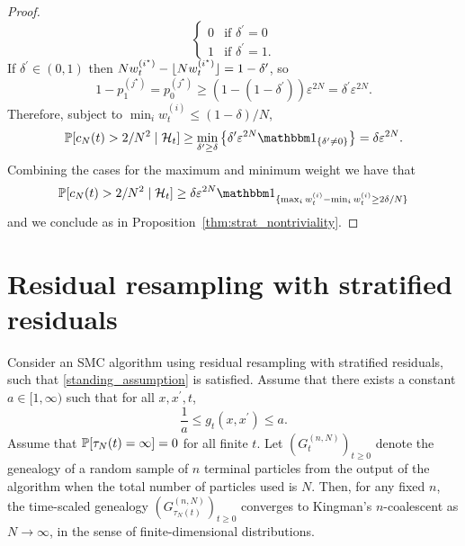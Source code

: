 \begin{proof}
\begin{equation*}
\begin{cases}
    0 & \text{if } \delta^\prime = 0 \\
    1 & \text{if } \delta^\prime = 1 .
\end{cases}
\end{equation*}
If $\delta^\prime \in (0,1)$ then
$N w_t^{(i^\star)} - \flnw[i^\star] = 1- \delta^\prime$, so
\begin{equation*}
1 - p_1^{(j^\star)}
= p_0^{(j^\star)}
\geq ( 1- (1-\delta^\prime) ) \varepsilon^{2N}
= \delta^\prime \varepsilon^{2N} .
\end{equation*}
Therefore, subject to $\min_i w_t^{(i)} \leq (1-\delta)/N$,
\begin{equation*}
\Prob[ c_N(t) > 2/N^2 \mid \mathcal{H}_t ]
\geq \min_{\delta^\prime \geq \delta} 
        \left\{ \delta^\prime \varepsilon^{2N} \I{\delta^\prime \neq 0} \right\}
= \delta \varepsilon^{2N} .
\end{equation*}
Combining the cases for the maximum and minimum weight we have that
\begin{equation*}
\Prob[ c_N(t) > 2/N^2 \mid \mathcal{H}_t ] 
\geq \delta \varepsilon^{2N} \I{ \max_i w_t^{(i)} - \min_i w_t^{(i)} \geq 2\delta/N }
\end{equation*}
and we conclude as in Proposition~\ref{thm:strat_nontriviality}.
\end{proof}




\section{Residual resampling with stratified residuals \seb{$\checkmark$} }

\begin{corollary}\label{thm:residual_stratified}
Consider an SMC algorithm using residual resampling with stratified residuals, such that \ref{standing_assumption} is satisfied.
Assume that there exists a constant $a\in [1,\infty)$ such that for all $x, x^\prime, t$,
\begin{equation*}
\frac{1}{a} \leq g_t(x, x^\prime) \leq a .
\end{equation*}
Assume that $\Prob[ \tau_N(t) = \infty] =0$ for all finite $t$.
Let $(G_t^{(n,N)})_{t\geq0}$ denote the genealogy of a random sample of $n$ terminal particles from the output of the algorithm when the total number of particles used is $N$. Then, for any fixed $n$, the time-scaled genealogy $(G_{\tau_N(t)}^{(n,N)})_{t\geq0}$ converges to Kingman's $n$-coalescent as $N\to \infty$, in the sense of finite-dimensional distributions.
\end{corollary}

